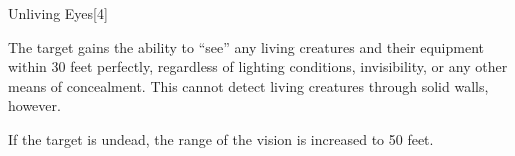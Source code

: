 \begin{spellsection}{Unliving Eyes}[4]
    \begin{spellheader}
    \end{spellheader}
    \begin{spellcontent}
        \begin{spelltargetinginfo}
        \end{spelltargetinginfo}
        \begin{spelleffects}
            \spelleffect The target gains the ability to ``see'' any living creatures and their equipment within 30 feet perfectly, regardless of lighting conditions, invisibility, or any other means of concealment. This cannot detect living creatures through solid walls, however.

            If the target is undead, the range of the vision is increased to 50 feet.
            \spelldur \durpersonallong
        \end{spelleffects}
    \end{spellcontent}
    \begin{spellfooter}
        \miscastexplode
    \end{spellfooter}
    \begin{spellaugments}
    \end{spellaugments}
\end{spellsection}

